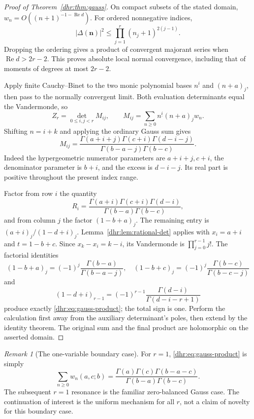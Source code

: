 \documentclass[11pt,letterpaper]{article}
\numberwithin{equation}{section}
\theoremstyle{definition}\newtheorem{definition}[theorem]{Definition}
\theoremstyle{remark}\newtheorem{remark}[theorem]{Remark}
\DeclareMathOperator{\Rea}{Re}
\newcommand{\fall}[2]{#1^{\underline{#2}}}
\begin{document}
\begin{proof}[Proof of Theorem~\ref{dhr:thm:gauss}]
On compact subsets of the stated domain,
$w_n=O((n+1)^{-1-\Rea d})$. For ordered nonnegative indices,
\[
 |\Delta(\bm n)|^2\leq\prod_{j=1}^r(n_j+1)^{2(j-1)}.
\]
Dropping the ordering gives a product of convergent majorant series
when $\Rea d>2r-2$. This proves absolute local normal convergence,
including that of moments of degrees at most $2r-2$.

Apply finite Cauchy--Binet to the two monic polynomial bases
$\fall{n}{i}$ and $(n+a)_j$, then pass to the normally convergent
limit. Both evaluation determinants equal the Vandermonde, so
\begin{equation}\label{dhr:eq:moment-det}
 Z_r=\det_{0\leq i,j<r}M_{ij},\qquad
 M_{ij}=\sum_{n\geq0}\fall{n}{i}(n+a)_j w_n.
\end{equation}
Shifting $n=i+k$ and applying the ordinary Gauss sum gives
\begin{equation}\label{dhr:eq:mixed-moment}
 M_{ij}=\frac{\Gamma(a+i+j)\Gamma(c+i)\Gamma(d-i-j)}
 {\Gamma(b-a-j)\Gamma(b-c)}.
\end{equation}
Indeed the hypergeometric numerator parameters are $a+i+j,c+i$,
the denominator parameter is $b+i$, and the excess is $d-i-j$.
Its real part is positive throughout the present index range.

Factor from row $i$ the quantity
\[
 R_i=\frac{\Gamma(a+i)\Gamma(c+i)\Gamma(d-i)}
 {\Gamma(b-a)\Gamma(b-c)},
\]
and from column $j$ the factor $(1-b+a)_j$. The remaining entry is
$(a+i)_j/(1-d+i)_j$. Lemma~\ref{dhr:lem:rational-det} applies with
$x_i=a+i$ and $t=1-b+c$. Since $x_k-x_i=k-i$, its Vandermonde
is $\prod_{j=0}^{r-1}j!$. The factorial identities
\[
 (1-b+a)_j=(-1)^j\frac{\Gamma(b-a)}{\Gamma(b-a-j)},\quad
 (1-b+c)_j=(-1)^j\frac{\Gamma(b-c)}{\Gamma(b-c-j)}
\]
and
\[
 (1-d+i)_{r-1}=(-1)^{r-1}
       \frac{\Gamma(d-i)}{\Gamma(d-i-r+1)}
\]
produce exactly \eqref{dhr:eq:gauss-product}; the total sign is one.
Perform the calculation first away from the auxiliary determinant's
poles, then extend by the identity theorem. The original sum and the
final product are holomorphic on the asserted domain.
\end{proof}

\begin{remark}[The one-variable boundary case]
For $r=1$, \eqref{dhr:eq:gauss-product} is simply
\[
 \sum_{n\geq0}w_n(a,c;b)
 =\frac{\Gamma(a)\Gamma(c)\Gamma(b-a-c)}
 {\Gamma(b-a)\Gamma(b-c)}.
\]
The subsequent $r=1$ resonance is the familiar zero-balanced Gauss
case. The continuation of interest is the uniform mechanism for all $r$,
not a claim of novelty for this boundary case.
\end{remark}
\end{document}
